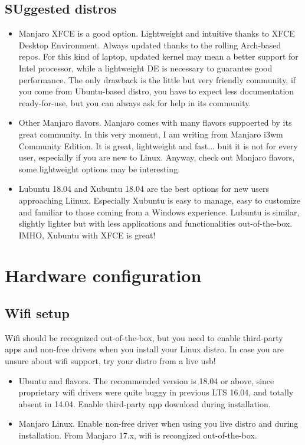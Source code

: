 \documentclass{article}
\begin{document}
\subsection{SUggested distros}
\begin{itemize}
	\item Manjaro XFCE is a good option. Lightweight and intuitive thanks to XFCE Desktop Environment. Always updated thanks to the rolling Arch-based repos. For this kind of laptop, updated kernel may mean a better support for Intel processor, while a lightweight DE is necessary to guarantee good performance. The only drawback is the little but very friendly community, if you come from Ubuntu-based distro, you have to expect less documentation ready-for-use, but you can always ask for help in its community.
	\item Other Manjaro flavors. Manjaro comes with many flavors suppoerted by its great community. In this very moment, I am writing from Manjaro i3wm Community Edition. It is great, lightweight and fast... buit it is not for every user, especially if you are new to Linux. Anyway, check out Manjaro flavors, some lightweight options may be interesting.
	\item Lubuntu 18.04 and Xubuntu 18.04 are the best options for new users approaching Liinux. Especially Xubuntu is easy to manage, easy to customize and familiar to those coming from a Windows experience. Lubuntu is similar, slightly lighter but with less applications and functionalities out-of-the-box. IMHO, Xubuntu with XFCE is great!
\end{itemize}


\section{Hardware configuration}

\subsection{Wifi setup}
Wifi should be recognized out-of-the-box, but you need to enable third-party apps and non-free drivers when you install your Linux distro. In case you are unsure about wifi support, try your distro from a live usb!
\begin{itemize}
	\item Ubuntu and flavors. The recommended version is 18.04 or above, since proprietary wifi drivers were quite buggy in previous LTS 16.04, and totally absent in 14.04. Enable third-party app download during installation.
	\item Manjaro Linux. Enable non-free driver when using you live distro and during installation. From Manjaro 17.x, wifi is recongized out-of-the-box.
\end{itemize}
\end{document}

